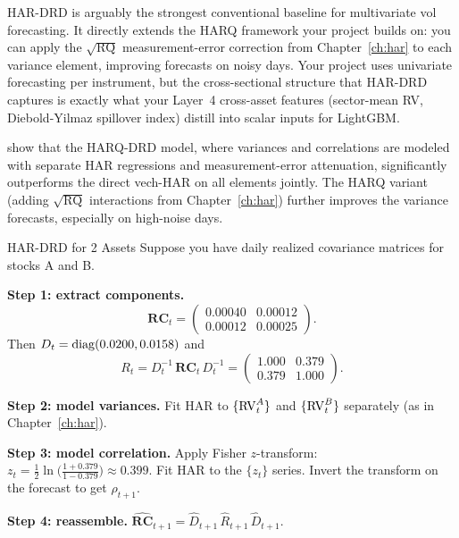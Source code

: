 \begin{projectconnection}
HAR-DRD is arguably the strongest conventional baseline for multivariate vol
forecasting. It directly extends the HARQ framework your project builds on:
you can apply the $\sqrt{\mathrm{RQ}}$ measurement-error correction from
Chapter~\ref{ch:har} to each variance element, improving forecasts on noisy
days. Your project uses univariate forecasting per instrument, but the
cross-sectional structure that HAR-DRD captures is exactly what your Layer~4
cross-asset features (sector-mean RV, Diebold-Yilmaz spillover index) distill
into scalar inputs for LightGBM.
\end{projectconnection}

\begin{keyresult}
\citet{BollerslevPattonQuaedvlieg2018} show that the HARQ-DRD model, where
variances and correlations are modeled with separate HAR regressions and
measurement-error attenuation, significantly outperforms the direct vech-HAR
on all elements jointly. The HARQ variant (adding $\sqrt{\operatorname{RQ}}$
interactions from Chapter~\ref{ch:har}) further improves the variance
forecasts, especially on high-noise days.
\end{keyresult}

\begin{workedexample}{HAR-DRD for 2 Assets}
Suppose you have daily realized covariance matrices for stocks A and B.

\textbf{Step 1: extract components.}
\[
  \mathbf{RC}_t = \begin{pmatrix} 0.00040 & 0.00012 \\ 0.00012 & 0.00025 \end{pmatrix}.
\]
Then $D_t = \operatorname{diag}(0.0200, 0.0158)$ and
\[
  R_t = D_t^{-1}\,\mathbf{RC}_t\, D_t^{-1}
  = \begin{pmatrix} 1.000 & 0.379 \\ 0.379 & 1.000 \end{pmatrix}.
\]

\textbf{Step 2: model variances.}  Fit HAR to $\{\operatorname{RV}_t^A\}$ and $\{\operatorname{RV}_t^B\}$
separately (as in Chapter~\ref{ch:har}).

\textbf{Step 3: model correlation.}  Apply Fisher $z$-transform:
$z_t = \frac{1}{2}\ln\!\bigl(\frac{1 + 0.379}{1 - 0.379}\bigr) \approx 0.399$.
Fit HAR to the $\{z_t\}$ series. Invert the transform on the forecast to get
$\hat{\rho}_{t+1}$.

\textbf{Step 4: reassemble.}
$\hat{\mathbf{RC}}_{t+1} = \hat{D}_{t+1}\,\hat{R}_{t+1}\,\hat{D}_{t+1}$.
\end{workedexample}

